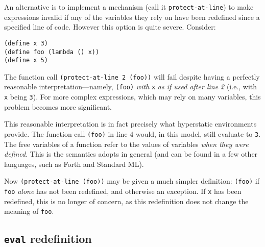 An alternative is to implement a mechanism (call it \texttt{protect-at-line}) to
make expressions invalid if any of the variables they rely on have been
redefined since a specified line of code.
However this option is quite severe. Consider:
\begin{lstlisting}
(define x 3)
(define foo (lambda () x))
(define x 5)
\end{lstlisting}
The function call \texttt{(protect-at-line 2 (foo))} will fail despite having a
perfectly reasonable interpretation---namely, \texttt{(foo)} \emph{with}
\texttt{x} \emph{as if used after line 2} (i.e., with \texttt{x} being
\texttt{3}). For more complex expressions, which may rely on many variables,
this problem becomes more significant.

This reasonable interpretation is in fact precisely what hyperstatic
environments provide. The function call \texttt{(foo)} in line 4 would, in this
model, still evaluate to \texttt{3}. The free variables of a function refer to
the values of variables \emph{when they were defined}. This is the semantics
\rad{} adopts in general (and can be found in a few other languages, such as
Forth and Standard ML\cite{SML1997}).

Now \texttt{(protect-at-line (foo))} may be given a much simpler definition:
\texttt{(foo)} if \texttt{foo} \emph{alone} has not been redefined, and otherwise
an exception. If \texttt{x} has been redefined, this is no longer of concern, as this
redefinition does not change the meaning of \texttt{foo}.


\subsection{\texttt{eval} redefinition}

